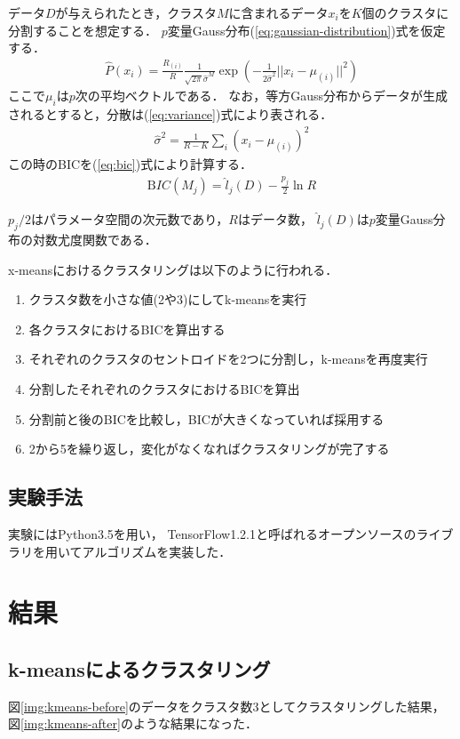 \documentclass[10pt,a4j,twocolumn]{ltjsarticle}
\def\figref#1{図\ref{#1}}
\def\eqref#1{(\ref{#1})式}
\begin{document}
データ$D$が与えられたとき，クラスタ$M$に含まれるデータ$x_i$を$K$個のクラスタに分割することを想定する．
$p$変量Gauss分布\eqref{eq:gaussian-distribution}を仮定する．
\begin{align}
  \label{eq:gaussian-distribution}
  \hat{P}(x_i) = \frac{R_{(i)}}{R}\frac{1}{\sqrt{2\pi}\hat{\sigma}^M}
    \exp\left(-\frac{1}{2\hat{\sigma}^2}||x_i-\mu_{(i)}||^2\right)
\end{align}
ここで$\mu_{i}$は$p$次の平均ベクトルである．
なお，等方Gauss分布からデータが生成されるとすると，分散は\eqref{eq:variance}により表される．
\begin{align}
  \label{eq:variance}
  \hat{\sigma}^2 = \frac{1}{R-K}\sum_i\left(x_i - \mu_{(i)}\right)^2
\end{align}
この時のBICを\eqref{eq:bic}により計算する．
\begin{align}
  \label{eq:bic}
  {\mathrm BIC}(M_j) = \hat{l}_j(D) - \frac{p_j}{2}\ln R
\end{align}

$p_j/2$はパラメータ空間の次元数であり，$R$はデータ数，
$\hat{l}_j(D)$は$p$変量Gauss分布の対数尤度関数である．

x-meansにおけるクラスタリングは以下のように行われる．
\begin{enumerate}
  \item クラスタ数を小さな値(2や3)にしてk-meansを実行
  \item 各クラスタにおけるBICを算出する
  \item それぞれのクラスタのセントロイドを2つに分割し，k-meansを再度実行
  \item 分割したそれぞれのクラスタにおけるBICを算出
  \item 分割前と後のBICを比較し，BICが大きくなっていれば採用する
  \item 2から5を繰り返し，変化がなくなればクラスタリングが完了する
\end{enumerate}

\subsection{実験手法}
実験にはPython3.5を用い，
TensorFlow1.2.1と呼ばれるオープンソースのライブラリを用いてアルゴリズムを実装した．

\section{結果}
\subsection{k-meansによるクラスタリング}
\figref{img:kmeans-before}のデータをクラスタ数3としてクラスタリングした結果，
\figref{img:kmeans-after}のような結果になった．
\end{document}
